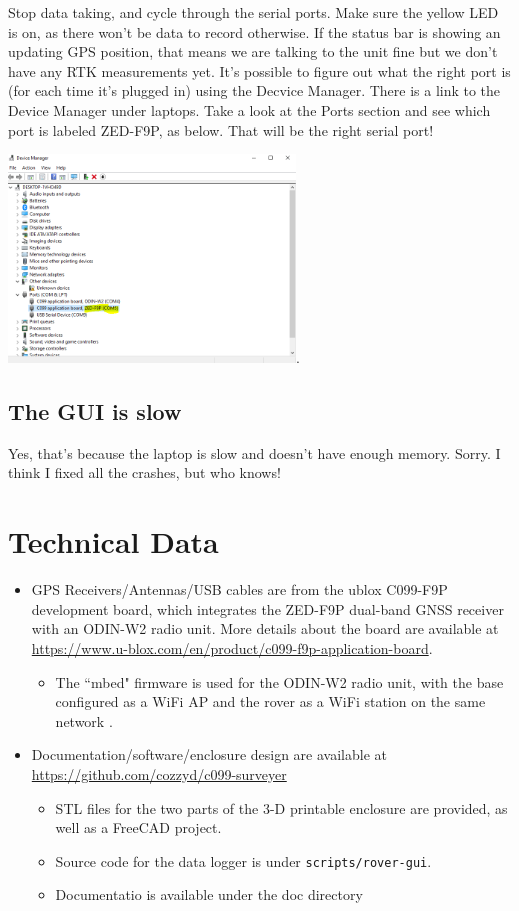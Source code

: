 \documentclass[usletter]{article}
\begin{document}
Stop data taking, and cycle through the serial ports.  Make sure the yellow LED is on, as there  won't be  data to record otherwise. If the status bar is showing an updating GPS position, that means we are talking to the unit fine but we don't have any RTK measurements yet. 
It's possible to figure out what the right port is (for each time it's plugged in) using the Decvice Manager. There is a link to the Device Manager under laptops. Take a look at the Ports section and see which port is labeled ZED-F9P, as below. That will be the right serial port! 
\begin{center}
\includegraphics[width=3in]{device_manager}. 
\end{center}

\subsection{The GUI is slow} 

Yes, that's because the laptop is slow and doesn't have enough memory. Sorry. I think I fixed all the crashes, but who knows! 


\section{Technical Data} 

\begin{itemize} 

\item GPS Receivers/Antennas/USB cables are from the ublox C099-F9P development board, which integrates the ZED-F9P dual-band GNSS receiver with an ODIN-W2 radio unit. More details about the board are available at \url{https://www.u-blox.com/en/product/c099-f9p-application-board}. 
\begin{itemize} 
\item The ``mbed" firmware is used for the ODIN-W2 radio unit, with the base configured as a WiFi AP and the rover as a WiFi station on the same network .

\end{itemize} 
\item Documentation/software/enclosure design are available at \url{https://github.com/cozzyd/c099-surveyer} 
\begin{itemize} 
\item STL files for the two parts of the 3-D printable enclosure are provided, as well as a FreeCAD project. 
\item Source code for the data logger is under \texttt{scripts/rover-gui}. 
\item Documentatio is available under the doc directory 
\end{itemize} 
\end{itemize} 
\end{document}
